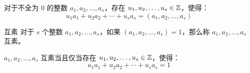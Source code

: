 \begin{proposition}
	对于不全为 $0$ 的整数 $a_1, a_2, \ldots, a_s$，存在 $u_1, u_2, \ldots, u_s \in \mathbb Z$，使得：
	$$
	u_1 a_1 + u_2 a_2 + \cdots + u_s a_s = (a_1, a_2, \ldots, a_s)
	$$
\end{proposition}

\begin{definition}{互素}
	对于 $s$ 个整数 $a_1, a_2, \ldots, a_s$，如果 $(a_1, a_2, \ldots, a_s) = 1$，那么称 $a_1, a_2, \ldots, a_s$ 互素。
\end{definition}

\begin{proposition}[互素的充分必要条件]
	$a_1, a_2, \ldots, a_s$ 互素当且仅当存在 $u_1, u_2, \ldots, u_s \in \mathbb Z$，使得：
	$$
	u_1 a_1 + u_2 a_2 + \cdots + u_s a_s = 1
	$$
\end{proposition}